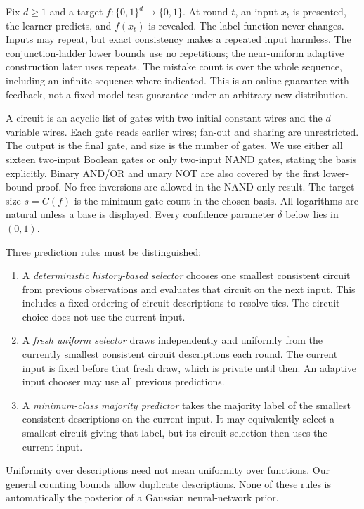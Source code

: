 \documentclass[11pt]{article}
\begin{document}
Fix $d\ge1$ and a target $f:\{0,1\}^d\to\{0,1\}$. At round $t$, an
input $x_t$ is presented, the learner predicts, and $f(x_t)$ is revealed.
The label function never changes. Inputs may repeat, but exact consistency
makes a repeated input harmless. The conjunction-ladder lower bounds use
no repetitions; the near-uniform adaptive construction later uses repeats.
The mistake count is over the whole sequence, including an infinite
sequence where indicated. This is an online guarantee with feedback,
not a fixed-model test guarantee under an arbitrary new distribution.

A circuit is an acyclic list of gates with two initial constant wires
and the $d$ variable wires. Each gate reads earlier wires; fan-out and
sharing are unrestricted. The output is the final gate, and size is the
number of gates. We use either all sixteen two-input Boolean gates or
only two-input NAND gates, stating the basis explicitly. Binary AND/OR
and unary NOT are also covered by the first lower-bound proof.
No free inversions are allowed in the NAND-only result.
The target size $s=C(f)$ is the minimum gate count in the chosen basis.
All logarithms are natural unless a base is displayed. Every confidence
parameter $\delta$ below lies in $(0,1)$.

Three prediction rules must be distinguished:
\begin{enumerate}
\item A \emph{deterministic history-based selector} chooses one smallest
consistent circuit from previous observations and evaluates that circuit
on the next input. This includes a fixed ordering of circuit descriptions
to resolve ties. The circuit choice does not use the current input.
\item A \emph{fresh uniform selector} draws independently and uniformly
from the currently smallest consistent circuit descriptions each round.
The current input is fixed before that fresh draw, which is private until
then. An adaptive input chooser may use all previous predictions.
\item A \emph{minimum-class majority predictor} takes the majority label
of the smallest consistent descriptions on the current input. It may
equivalently select a smallest circuit giving that label, but its circuit
selection then uses the current input.
\end{enumerate}
Uniformity over descriptions need not mean uniformity over functions.
Our general counting bounds allow duplicate descriptions. None of these
rules is automatically the posterior of a Gaussian neural-network prior.
\end{document}
